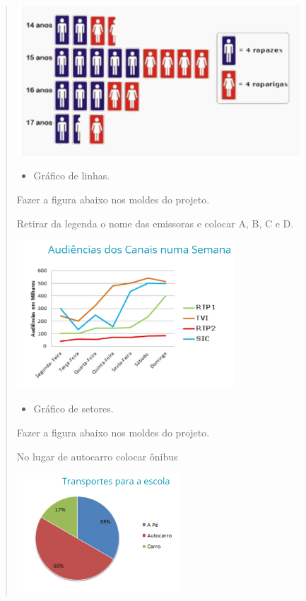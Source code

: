 \begin{mdframed}[linewidth=2pt,linecolor=salmao,roundcorner=2pt]
\begin{itemize}
{\begin{itemize}
\begin{escolha}
{\begin{quote}
{\begin{escolha}
{{{\includegraphics[width=4.18370in,height=2.21686in]{media/image92.png}

\begin{itemize}
\item
  Gráfico de linhas.
\end{itemize}

Fazer a figura abaixo nos moldes do projeto.

Retirar da legenda o nome das emissoras e colocar A, B, C e D.

\includegraphics[width=3.19872in,height=2.19483in]{media/image93.png}

\begin{itemize}
\item
  Gráfico de setores.
\end{itemize}

Fazer a figura abaixo nos moldes do projeto.

No lugar de autocarro colocar ônibus

\includegraphics[width=2.42308in,height=1.74971in]{media/image94.png}

}}}
\end{escolha}}
\end{quote}}
\end{escolha}
\end{itemize}}
\end{itemize}
\end{mdframed}
